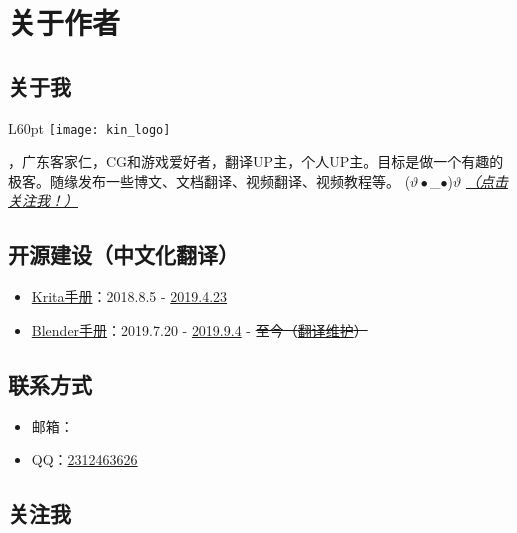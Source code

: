 \chapter*{关于作者}

\section*{关于我}
\begin{wrapfigure}[3]{L}{60pt}
    \vspace*{-15pt}
    \centering
    \texttt{[image: kin\_logo]}
\end{wrapfigure}
\textbf{\the\AuthorName}，广东客家仁，CG和游戏爱好者，翻译UP主，个人UP主。目标是做一个有趣的极客。随缘发布一些博文、文档翻译、视频翻译、视频教程等。 ($\vartheta\bullet$\_$\bullet$)$\vartheta$ \hyperlink{follow}{\emph{（点击关注我！）}}

\section*{开源建设（中文化翻译）}
\begin{itemize}
    \item \href{https://docs.krita.org/zh_CN/}{Krita手册}：2018.8.5 - \href{https://crowdin.com/profile}{2019.4.23}
    \item \href{https://docs.blender.org/manual/zh-hans/latest/}{Blender手册}：2019.7.20 - \href{https://www.blendercn.org/5812.html?tdsourcetag=s_pctim_aiomsg}{2019.9.4} - \sout{至今（\href{https://developer.blender.org/p/Mr_Kin/}{翻译维护}）}
\end{itemize}

\section*{\hypertarget{contact}{联系方式}}

\begin{itemize}
    \item 邮箱：\href{mailto:\the\AuthorEmail}{\the\AuthorEmail}
    \item QQ：\href{tencent://AddContact/?fromId=45&fromSubId=1&subcmd=all&uin=2312463626&website=www.oicqzone.com}{2312463626}
\end{itemize}

\section*{\hypertarget{follow}{关注我}}


